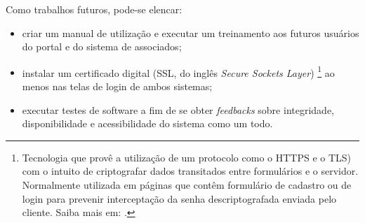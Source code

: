 Como trabalhos futuros, pode-se elencar:

\begin{itemize}
 \item criar um manual de utilização e executar um treinamento aos futuros usuários do portal e do sistema de associados;
 \item instalar um certificado digital (SSL, do inglês \textit{Secure Sockets Layer}) \footnote{Tecnologia que provê a utilização de um protocolo como o HTTPS e o TLS) com o intuito de criptografar dados transitados entre formulários e o servidor. Normalmente utilizada em páginas que contêm formulário de cadastro ou de login para prevenir interceptação da senha descriptografada enviada pelo cliente. Saiba mais em: .} ao menos nas telas de login de ambos sistemas;
 \item executar testes de software a fim de se obter \textit{feedbacks} sobre integridade, disponibilidade e acessibilidade do sistema como um todo.
\end{itemize}


